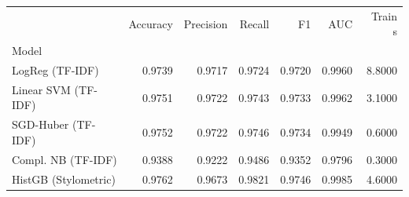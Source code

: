 \begin{tabular}{lrrrrrr}
\toprule
 & Accuracy & Precision & Recall & F1 & AUC & Train s \\
Model &  &  &  &  &  &  \\
\midrule
LogReg (TF-IDF) & 0.9739 & 0.9717 & 0.9724 & 0.9720 & 0.9960 & 8.8000 \\
Linear SVM (TF-IDF) & 0.9751 & 0.9722 & 0.9743 & 0.9733 & 0.9962 & 3.1000 \\
SGD-Huber (TF-IDF) & 0.9752 & 0.9722 & 0.9746 & 0.9734 & 0.9949 & 0.6000 \\
Compl. NB (TF-IDF) & 0.9388 & 0.9222 & 0.9486 & 0.9352 & 0.9796 & 0.3000 \\
HistGB (Stylometric) & 0.9762 & 0.9673 & 0.9821 & 0.9746 & 0.9985 & 4.6000 \\
\bottomrule
\end{tabular}
